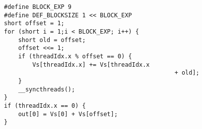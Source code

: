 \begin{verbatim}
#define BLOCK_EXP 9
#define DEF_BLOCKSIZE 1 << BLOCK_EXP
short offset = 1;
for (short i = 1;i < BLOCK_EXP; i++) {
    short old = offset;
    offset <<= 1;
    if (threadIdx.x % offset == 0) {
        Vs[threadIdx.x] += Vs[threadIdx.x
        										+ old];
    }
    __syncthreads();
}
if (threadIdx.x == 0) {
    out[0] = Vs[0] + Vs[offset];
}
\end{verbatim}